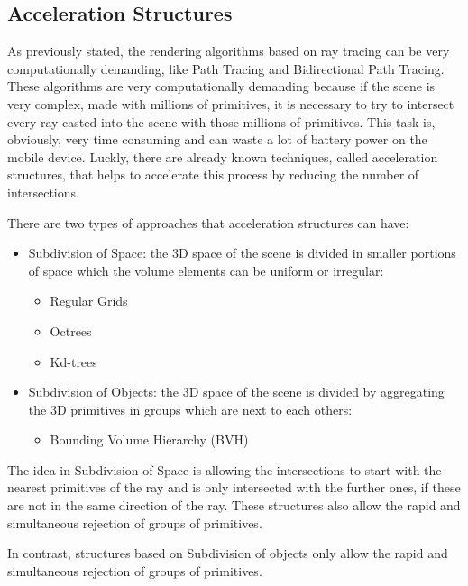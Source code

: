 \subsection{Acceleration Structures}

\par
As previously stated, the rendering algorithms based on ray tracing can be very computationally demanding, like Path Tracing and Bidirectional Path Tracing.
These algorithms are very computationally demanding because if the scene is very complex, made with millions of primitives, it is necessary to try to intersect every ray casted into the scene with those millions of primitives.
This task is, obviously, very time consuming and can waste a lot of battery power on the mobile device.
Luckly, there are already known techniques, called acceleration structures, that helps to accelerate this process by reducing the number of intersections.

\par
There are two types of approaches that acceleration structures can have:

\begin{itemize}
	\item Subdivision of Space: the 3D space of the scene is divided in smaller portions of space which the volume elements can be uniform or irregular:
	\begin{itemize}
		\item Regular Grids
		\item Octrees
		\item Kd-trees
	\end{itemize}
	\item Subdivision of Objects: the 3D space of the scene is divided by aggregating the 3D primitives in groups which are next to each others:
	\begin{itemize}
		\item Bounding Volume Hierarchy (BVH)
	\end{itemize}
\end{itemize}

\par
The idea in Subdivision of Space is allowing the intersections to start with the nearest primitives of the ray and is only intersected with the further ones, if these are not in the same direction of the ray.
These structures also allow the rapid and simultaneous rejection of groups of primitives.

\par
In contrast, structures based on Subdivision of objects only allow the rapid and simultaneous rejection of groups of primitives.

